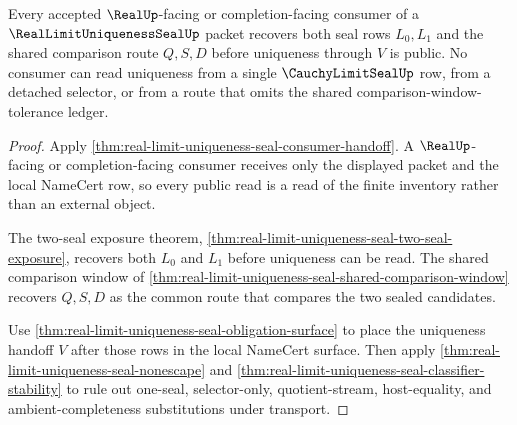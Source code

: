 \begin{theorem}
\label{thm:real-limit-uniqueness-seal-cauchy-limit-pair-readback}
Every accepted $\RealUp$-facing or completion-facing consumer of a $\RealLimitUniquenessSealUp$ packet recovers both seal rows $L_0,L_1$ and the shared comparison route $Q,S,D$ before uniqueness through $V$ is public. No consumer can read uniqueness from a single $\CauchyLimitSealUp$ row, from a detached selector, or from a route that omits the shared comparison-window-tolerance ledger.
\end{theorem}
\begin{proof}
Apply \autoref{thm:real-limit-uniqueness-seal-consumer-handoff}. A $\RealUp$-facing or completion-facing consumer receives only the displayed packet and the local NameCert row, so every public read is a read of the finite inventory rather than an external object.

The two-seal exposure theorem, \autoref{thm:real-limit-uniqueness-seal-two-seal-exposure}, recovers both $L_0$ and $L_1$ before uniqueness can be read. The shared comparison window of \autoref{thm:real-limit-uniqueness-seal-shared-comparison-window} recovers $Q,S,D$ as the common route that compares the two sealed candidates.

Use \autoref{thm:real-limit-uniqueness-seal-obligation-surface} to place the uniqueness handoff $V$ after those rows in the local NameCert surface. Then apply \autoref{thm:real-limit-uniqueness-seal-nonescape} and \autoref{thm:real-limit-uniqueness-seal-classifier-stability} to rule out one-seal, selector-only, quotient-stream, host-equality, and ambient-completeness substitutions under transport.
\end{proof}

